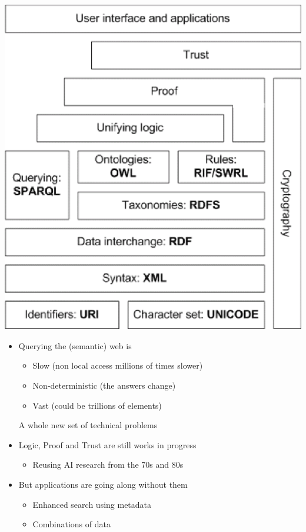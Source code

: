 \documentclass[a4paper,landscape,headrule,footrule,xetex]{foils}
\begin{document}
\includegraphics[height=\textheight]{../pics/semantic-web-layers.eps}


\begin{itemize}
\item Querying the (semantic) web is 
  \begin{itemize}
  \item Slow (non local access \into millions of times slower)
  \item Non-deterministic (the answers change)
  \item Vast (could be trillions of elements)
  \end{itemize}
  A whole new set of technical problems
\item Logic, Proof and Trust are still works in progress
  \begin{itemize}
  \item Reusing AI research from the 70s and 80s
  \end{itemize}
\item But applications are going along without them
  \begin{itemize}
  \item Enhanced search using metadata
  \item Combinations of data
  \end{itemize}
\end{itemize}
\end{document}
